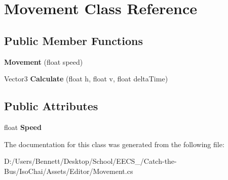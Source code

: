 \hypertarget{class_movement}{}\section{Movement Class Reference}
\label{class_movement}
\subsection*{Public Member Functions}
\begin{DoxyCompactItemize}
\item 
\mbox{\label{class_movement_a60adcc04d8d2c08f58e58cfc3672c0a4}} 
{\bfseries Movement} (float speed)
\item 
\mbox{\label{class_movement_a5d5ad7851ffd2b612cd058abc1cfeb36}} 
Vector3 {\bfseries Calculate} (float h, float v, float delta\+Time)
\end{DoxyCompactItemize}
\subsection*{Public Attributes}
\begin{DoxyCompactItemize}
\item 
\mbox{\label{class_movement_a88607421eca70deeb7c3f832ceb5fef1}} 
float {\bfseries Speed}
\end{DoxyCompactItemize}


The documentation for this class was generated from the following file\+:\begin{DoxyCompactItemize}
\item 
D\+:/\+Users/\+Bennett/\+Desktop/\+School/\+E\+E\+C\+S\+\_/\+Catch-\/the-\/\+Bus/\+Iso\+Chai/\+Assets/\+Editor/Movement.\+cs\end{DoxyCompactItemize}
